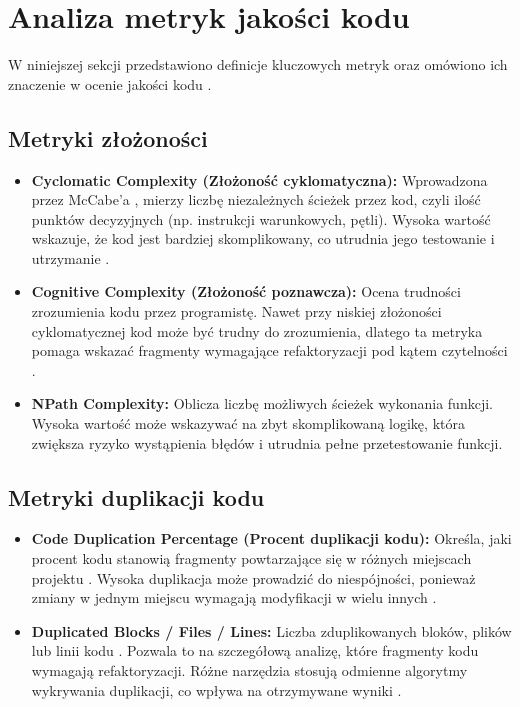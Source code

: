 \documentclass[a4paper,12pt]{article}
\begin{document}
\section{Analiza metryk jakości kodu} 
W niniejszej sekcji przedstawiono definicje kluczowych metryk oraz omówiono ich znaczenie w ocenie jakości kodu \cite{chidamber1994metrics, fenton2014software}. 

\subsection{Metryki złożoności}
\begin{itemize} 
\item \textbf{Cyclomatic Complexity (Złożoność cyklomatyczna):} Wprowadzona przez McCabe'a \cite{mccabe1976complexity}, mierzy liczbę niezależnych ścieżek przez kod, czyli ilość punktów decyzyjnych (np. instrukcji warunkowych, pętli). Wysoka wartość wskazuje, że kod jest bardziej skomplikowany, co utrudnia jego testowanie i utrzymanie \cite{sonarqube2023}. 
\item \textbf{Cognitive Complexity (Złożoność poznawcza):} Ocena trudności zrozumienia kodu przez programistę. Nawet przy niskiej złożoności cyklomatycznej kod może być trudny do zrozumienia, dlatego ta metryka pomaga wskazać fragmenty wymagające refaktoryzacji pod kątem czytelności \cite{qodana2023metrics}. 
\item \textbf{NPath Complexity:} Oblicza liczbę możliwych ścieżek wykonania funkcji. Wysoka wartość może wskazywać na zbyt skomplikowaną logikę, która zwiększa ryzyko wystąpienia błędów i utrudnia pełne przetestowanie funkcji. 
\end{itemize}
\subsection{Metryki duplikacji kodu}
\begin{itemize} 
\item \textbf{Code Duplication Percentage (Procent duplikacji kodu):} Określa, jaki procent kodu stanowią fragmenty powtarzające się w różnych miejscach projektu \cite{habib2015systematic}. Wysoka duplikacja może prowadzić do niespójności, ponieważ zmiany w jednym miejscu wymagają modyfikacji w wielu innych \cite{qodana2023metrics}. 
\item \textbf{Duplicated Blocks / Files / Lines:} Liczba zduplikowanych bloków, plików lub linii kodu \cite{sonarqube2023}. Pozwala to na szczegółową analizę, które fragmenty kodu wymagają refaktoryzacji. Różne narzędzia stosują odmienne algorytmy wykrywania duplikacji, co wpływa na otrzymywane wyniki \cite{habib2015systematic}.
\end{itemize}
\end{document}
